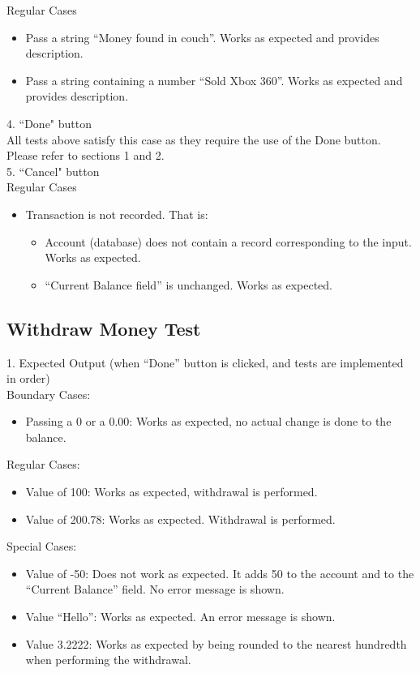 \documentclass[12pt]{article}
\begin{document}
Regular Cases
\begin{itemize}
  \item Pass a string ``Money found in couch''. Works as expected and provides description.
  \item Pass a string containing a number ``Sold Xbox 360''. Works as expected and provides description.
\end{itemize}

4. ``Done" button\\

All tests above satisfy this case as they require the use of the Done button. Please refer to sections 1 and 2.\\
	
5. ``Cancel" button\\

Regular Cases
\begin{itemize}
  \item Transaction is not recorded. That is:
  \begin{itemize}
    \item Account (database) does not contain a record corresponding to the input. Works as expected.
    \item ``Current Balance field'' is unchanged. Works as expected.
  \end{itemize}
\end{itemize}

\subsection{Withdraw Money Test}

1. Expected Output (when ``Done'' button is clicked, and tests are implemented in order)\\

Boundary Cases:
\begin{itemize}
  \item Passing a 0 or a 0.00: Works as expected, no actual change is done to the balance.
\end{itemize}

Regular Cases:
\begin{itemize}
  \item Value of 100: Works as expected, withdrawal is performed.
  \item Value of 200.78: Works as expected. Withdrawal is performed.
\end{itemize}

Special Cases:
\begin{itemize}
  \item Value of -50: Does not work as expected.  It adds 50 to the account and to the ``Current Balance'' field. No error message is shown.
  \item Value ``Hello'': Works as expected. An error message is shown.
  \item Value 3.2222: Works as expected by being rounded to the nearest hundredth when performing the withdrawal. 
\end{itemize}
\end{document}
